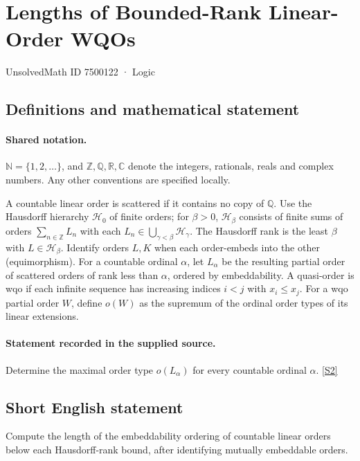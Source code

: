\documentclass[11pt]{article}
\newcommand{\sref}[2]{\hyperlink{source:#1:#2}{[S#2]}}
\begin{document}
\setcounter{section}{7500121}
\section{Lengths of Bounded-Rank Linear-Order WQOs}\label{7500122}
{\small\sffamily UnsolvedMath ID 7500122 · Logic}
\subsection{Definitions and mathematical statement}

\paragraph{Shared notation.}$\mathbb N=\{1,2,\ldots\}$, and $\mathbb Z,\mathbb Q,\mathbb R,\mathbb C$ denote the integers, rationals, reals and complex numbers. Any other conventions are specified locally.


A countable linear order is scattered if it contains no copy of $\mathbb Q$. Use the Hausdorff hierarchy $\mathcal H_0$ of finite orders; for $\beta>0$, $\mathcal H_\beta$ consists of finite sums of orders $\sum_{n\in\mathbb Z}L_n$ with each $L_n\in\bigcup_{\gamma<\beta}\mathcal H_\gamma$. The Hausdorff rank is the least $\beta$ with $L\in\mathcal H_\beta$. Identify orders $L,K$ when each order-embeds into the other (equimorphism). For a countable ordinal $\alpha$, let $L_\alpha$ be the resulting partial order of scattered orders of rank less than $\alpha$, ordered by embeddability. A quasi-order is wqo if each infinite sequence has increasing indices $i<j$ with $x_i\le x_j$. For a wqo partial order $W$, define $o(W)$ as the supremum of the ordinal order types of its linear extensions.
\paragraph{Statement recorded in the supplied source.}
Determine the maximal order type $o(L_\alpha)$ for every countable ordinal $\alpha$. \sref{7500122}{2}
\subsection{Short English statement}
Compute the length of the embeddability ordering of countable linear orders below each Hausdorff-rank bound, after identifying mutually embeddable orders.
\end{document}
